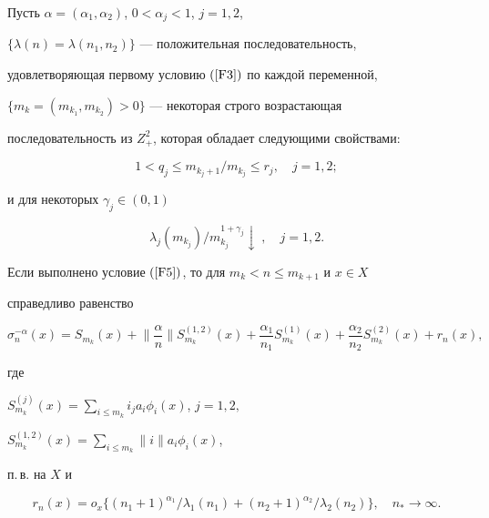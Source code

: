 \begin{lemnonum}


Пусть $\alpha =(\alpha_1,\alpha_2)$, $0<\alpha_j<1$, $j=1,2$,


$\{\lambda (n)=\lambda (n_1,n_2)\} $ --- положительная последовательность,


удовлетворяющая первому условию $(\ref{F3})$ по каждой переменной,


$\{m_k=(m_{k_1},m_{k_2})>0\}$ --- некоторая строго возрастающая 


последовательность из $Z_+^2$, которая обладает следующими свойствами\/${:}$


\begin{equation}


\label{F7}


1<q_j\le m_{k_j+1}/m_{k_j} \le r_j , \quad j=1,2;


\end{equation}


и для некоторых $\gamma_j \in (0,1)$


\begin{equation}


\label{F8}


\lambda_j(m_{k_j})/m_{k_j}^{1+\gamma_j}\!\downarrow\;, \quad j=1,2.


\end{equation}


Если выполнено условие $(\ref{F5})$, то для $m_k<n\le m_{k+1}$ и $x\in X$ 


справедливо равенство


\begin{equation}


\label{F9}


\sigma_n^{-\alpha }(x)=S_{m_k}(x)+\bigg\| \frac{\alpha }{n} \bigg\|


S_{m_k}^{(1,2)}(x)+\frac{\alpha_1}{n_1}S_{m_k}^{(1)}(x)+


\frac{\alpha_2}{n_2}S_{m_k}^{(2)}(x)+r_n(x),


\end{equation}


где


$S_{m_k}^{(j)}(x)=\sum \limits_{i \le m_k}i_ja_i\phi_i(x)$, $j=1,2,$


$S_{m_k}^{(1,2)}(x)=\sum \limits_{i \le m_k}\| i \|a_i\phi_i(x)$,


п.\,в. на $X$ и


$$




r_n(x)=o_x \{ (n_1+1)^{\alpha_1}/\lambda_1(n_1)+


(n_2+1)^{\alpha_2}/\lambda_2(n_2) \}, \quad n_* \to \infty .




$$


\end{lemnonum}








